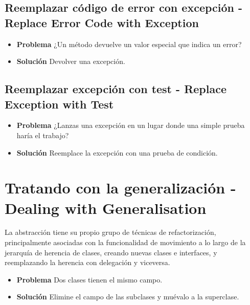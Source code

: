 \documentclass[11pt,a4paper,oneside]{book}
\begin{document}


\subsection{Reemplazar código de error con excepción - Replace Error Code with Exception}
\label{reemplazarcodigoerrorexcepcion}
\begin{itemize}
    \item \textbf{Problema} ¿Un método devuelve un valor especial que indica un error?
    \item \textbf{Solución} Devolver una excepción.
\end{itemize}
    


\subsection{Reemplazar excepción con test - Replace Exception with Test}
\label{reemplazarexcepcioncontest}
\begin{itemize}
    \item \textbf{Problema} ¿Lanzas una excepción en un lugar donde una simple prueba haría el trabajo?
    \item \textbf{Solución} Reemplace la excepción con una prueba de condición.
\end{itemize}
    



\section{Tratando con la generalización - Dealing with Generalisation}
La abstracción tiene su propio grupo de técnicas de refactorización, principalmente asociadas con la funcionalidad de movimiento a lo largo de la jerarquía de herencia de clases, creando nuevas clases e interfaces, y reemplazando la herencia con delegación y viceversa.

\label{renombrarmetodo}
\begin{itemize}
    \item \textbf{Problema} Dos clases tienen el mismo campo.
    \item \textbf{Solución} Elimine el campo de las subclases y muévalo a la superclase.
\end{itemize}
\end{document}
